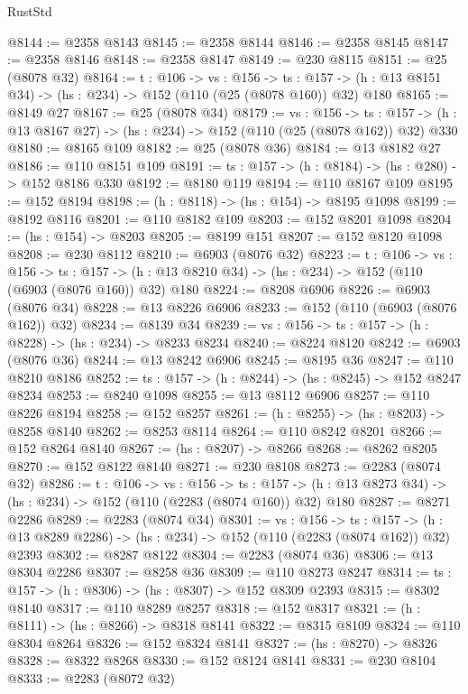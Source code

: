 \begin{lexlean}{RustStd}
\begin{coremodule}
@8144 := @2358 @8143
@8145 := @2358 @8144
@8146 := @2358 @8145
@8147 := @2358 @8146
@8148 := @2358 @8147
@8149 := @230 @8115
@8151 := @25 (@8078 @32)
@8164 := {t : @106} ->
  {vs : @156} ->
  {ts : @157} -> (h : @13 @8151 @34) -> (hs : @234) -> @152 (@110 (@25 (@8078 @160)) @32) @180
@8165 := @8149 @27
@8167 := @25 (@8078 @34)
@8179 := {vs : @156} ->
  {ts : @157} -> (h : @13 @8167 @27) -> (hs : @234) -> @152 (@110 (@25 (@8078 @162)) @32) @330
@8180 := @8165 @109
@8182 := @25 (@8078 @36)
@8184 := @13 @8182 @27
@8186 := @110 @8151 @109
@8191 := {ts : @157} -> (h : @8184) -> (hs : @280) -> @152 @8186 @330
@8192 := @8180 @119
@8194 := @110 @8167 @109
@8195 := @152 @8194
@8198 := (h : @8118) -> (hs : @154) -> @8195 @1098
@8199 := @8192 @8116
@8201 := @110 @8182 @109
@8203 := @152 @8201 @1098
@8204 := (hs : @154) -> @8203
@8205 := @8199 @151
@8207 := @152 @8120 @1098
@8208 := @230 @8112
@8210 := @6903 (@8076 @32)
@8223 := {t : @106} ->
  {vs : @156} ->
  {ts : @157} -> (h : @13 @8210 @34) -> (hs : @234) -> @152 (@110 (@6903 (@8076 @160)) @32) @180
@8224 := @8208 @6906
@8226 := @6903 (@8076 @34)
@8228 := @13 @8226 @6906
@8233 := @152 (@110 (@6903 (@8076 @162)) @32)
@8234 := @8139 @34
@8239 := {vs : @156} -> {ts : @157} -> (h : @8228) -> (hs : @234) -> @8233 @8234
@8240 := @8224 @8120
@8242 := @6903 (@8076 @36)
@8244 := @13 @8242 @6906
@8245 := @8195 @36
@8247 := @110 @8210 @8186
@8252 := {ts : @157} -> (h : @8244) -> (hs : @8245) -> @152 @8247 @8234
@8253 := @8240 @1098
@8255 := @13 @8112 @6906
@8257 := @110 @8226 @8194
@8258 := @152 @8257
@8261 := (h : @8255) -> (hs : @8203) -> @8258 @8140
@8262 := @8253 @8114
@8264 := @110 @8242 @8201
@8266 := @152 @8264 @8140
@8267 := (hs : @8207) -> @8266
@8268 := @8262 @8205
@8270 := @152 @8122 @8140
@8271 := @230 @8108
@8273 := @2283 (@8074 @32)
@8286 := {t : @106} ->
  {vs : @156} ->
  {ts : @157} -> (h : @13 @8273 @34) -> (hs : @234) -> @152 (@110 (@2283 (@8074 @160)) @32) @180
@8287 := @8271 @2286
@8289 := @2283 (@8074 @34)
@8301 := {vs : @156} ->
  {ts : @157} -> (h : @13 @8289 @2286) -> (hs : @234) -> @152 (@110 (@2283 (@8074 @162)) @32) @2393
@8302 := @8287 @8122
@8304 := @2283 (@8074 @36)
@8306 := @13 @8304 @2286
@8307 := @8258 @36
@8309 := @110 @8273 @8247
@8314 := {ts : @157} -> (h : @8306) -> (hs : @8307) -> @152 @8309 @2393
@8315 := @8302 @8140
@8317 := @110 @8289 @8257
@8318 := @152 @8317
@8321 := (h : @8111) -> (hs : @8266) -> @8318 @8141
@8322 := @8315 @8109
@8324 := @110 @8304 @8264
@8326 := @152 @8324 @8141
@8327 := (hs : @8270) -> @8326
@8328 := @8322 @8268
@8330 := @152 @8124 @8141
@8331 := @230 @8104
@8333 := @2283 (@8072 @32)

\end{coremodule}
\end{lexlean}
